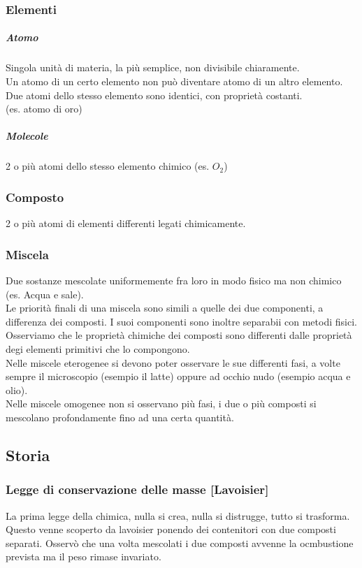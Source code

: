 \subsubsection{Elementi}
\subparagraph{Atomo}
Singola unità di materia, la più semplice, non divisibile chiaramente.\\
Un atomo di un certo elemento non può diventare atomo di un altro elemento.\\
Due atomi dello stesso elemento sono identici, con proprietà costanti.\\
(es. atomo di oro)
\subparagraph{Molecole}
2 o più atomi dello stesso elemento chimico (es. $O_2$)
\subsubsection{Composto}
2 o più atomi di elementi differenti legati chimicamente.
\subsubsection{Miscela}
Due sostanze mescolate uniformemente fra loro in modo fisico ma non chimico (es. Acqua e sale).\\
Le priorità finali di una miscela sono simili a quelle dei due componenti, a differenza dei composti. I suoi componenti sono inoltre separabii con metodi fisici.\\
Osserviamo che le proprietà chimiche dei composti sono differenti dalle proprietà degi elementi primitivi che lo compongono.\\
Nelle miscele eterogenee si devono poter osservare le sue differenti fasi, a volte sempre il microscopio (esempio il latte) oppure ad occhio nudo (esempio acqua e olio).\\
Nelle miscele omogenee non si osservano più fasi, i due o più composti si mescolano profondamente fino ad una certa quantità.
\subsection{Storia}
\subsubsection{Legge di conservazione delle masse [Lavoisier]}
La prima legge della chimica, nulla si crea, nulla si distrugge, tutto si trasforma.\\
Questo venne scoperto da lavoisier ponendo dei contenitori con due composti separati. Osservò che una volta mescolati i due composti avvenne la ocmbustione prevista ma il peso rimase invariato.
